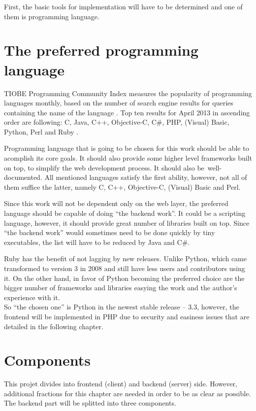 \documentclass[thesis=B,english]{FITthesis}[2013/04/26]
\begin{document}
First, the basic tools for implementation will have to be determined and one of them is programming language.

\section{The preferred programming language}

TIOBE Programming Community Index measures the popularity of programming languages monthly, based on the number of search engine results for queries containing the name of the language \cite{tiobe_def}. Top ten results for April 2013 in ascending order are following: C, Java, C++, Objective-C, C\#, PHP, (Visual) Basic, Python, Perl and Ruby \cite{tiobe_res}.

Programming language that is going to be chosen for this work should be able to acomplish its core goals. It should also provide some higher level frameworks built on top, to simplify the web development process. It should also be~well-documented. All mentioned languages satisfy the first ability, however, not all of them suffice the latter, namely C, C++, Objective-C, (Visual) Basic and Perl.

Since this work will not be dependent only on the web layer, the preferred language should be capable of doing ``the backend work''. It could be a scripting language, however, it should provide great number of libraries built on top. Since ``the backend work'' would sometimes need to be done quickly by tiny executables, the list will have to be reduced by Java and C\#.

Ruby has the benefit of not lagging by new releases. Unlike Python, which came transformed to version 3 in 2008 and still have less users and contributors using it. On the other hand, in favor of Python becoming the preferred choice are the bigger number of frameworks and libraries easying the work and the author's experience with it. \\

So ``the chosen one'' is Python in the newest stable release -- 3.3, however, the frontend will be implemented in PHP due to security and easiness issues that are detailed in the following chapter.

\section{Components}

This projet divides into frontend (client) and backend (server) side. However, additional fractions for this chapter are needed in order to be as clear as possible. The backend part will be splitted into three components.
\end{document}
